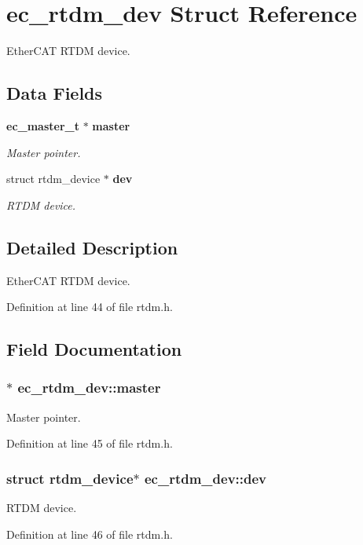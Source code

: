 \section{ec\-\_\-rtdm\-\_\-dev \-Struct \-Reference}
\label{structec__rtdm__dev}


\-Ether\-C\-A\-T \-R\-T\-D\-M device.  


\subsection*{\-Data \-Fields}
\begin{DoxyCompactItemize}
\item 
{\bf ec\-\_\-master\-\_\-t} $\ast$ {\bf master}
\begin{DoxyCompactList}\small\item\em \-Master pointer. \end{DoxyCompactList}\item 
struct rtdm\-\_\-device $\ast$ {\bf dev}
\begin{DoxyCompactList}\small\item\em \-R\-T\-D\-M device. \end{DoxyCompactList}\end{DoxyCompactItemize}


\subsection{\-Detailed \-Description}
\-Ether\-C\-A\-T \-R\-T\-D\-M device. 

\-Definition at line 44 of file rtdm.\-h.



\subsection{\-Field \-Documentation}
\subsubsection[{master}]{$\ast$ {\bf ec\-\_\-rtdm\-\_\-dev\-::master}}\label{structec__rtdm__dev_a26ad048dd4e31a5e34cfcecea2878a86}


\-Master pointer. 



\-Definition at line 45 of file rtdm.\-h.

\subsubsection[{dev}]{\setlength{\rightskip}{0pt plus 5cm}struct rtdm\-\_\-device$\ast$ {\bf ec\-\_\-rtdm\-\_\-dev\-::dev}}\label{structec__rtdm__dev_a35af4277898eb3c7207df514c0a51653}


\-R\-T\-D\-M device. 



\-Definition at line 46 of file rtdm.\-h.

